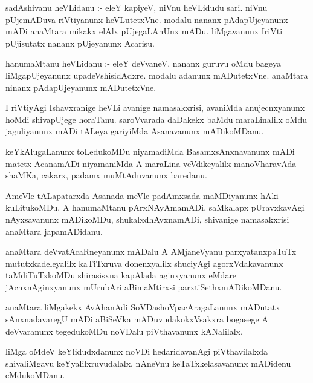 \documentclass{article}
\begin{document}
\begin{mn}
sadAshivanu  heVLidanu :- eleY  kapiyeV,  niVnu  heVLidudu  sari.  niVnu  pUjemADuva  riVtiyanunx  
heVLutetxVne.  modalu  nananx  pAdapUjeyanunx  mADi  anaMtara  mikakx  elAlx  pUjegaLAnUnx  mADu.  
liMgavanunx  IriVti  pUjisutatx  nananx  pUjeyanunx  Acarisu.
\end{mn}

\begin{mn}
hanumaMtanu  heVLidanu :- eleY  deVvaneV,  nananx  guruvu  oMdu  bageya  liMgapUjeyanunx  upadeVshisidAdxre.  
modalu  adanunx  mADutetxVne.  anaMtara  ninanx  pAdapUjeyanunx  mADutetxVne.
\end{mn}

\begin{mn}
I riVtiyAgi  Ishavxranige  heVLi  avanige  namasakxrisi,  avaniMda  anujecnxyanunx  hoMdi  shivapUjege  horaTanu.  
saroVvarada  daDakekx  baMdu  maraLinalilx  oMdu  jaguliyanunx  mADi  tALeya  gariyiMda  Asanavanunx  mADikoMDanu.
\end{mn}

\begin{mn}
keYkAlugaLanunx  toLedukoMDu  niyamadiMda  BasamxsAnxnavanunx  mADi  matetx  AcanamADi  niyamaniMda  
A  maraLina  veVdikeyalilx  manoVharavAda  shaMKa,  cakarx,  padamx  muMtAduvanunx  baredanu.
\end{mn}

\begin{mn}
AmeVle  tALapatarxda  Asanada  meVle  padAmxsada  maMDiyanunx  hAki  kuLitukoMDu,  A  hanumaMtanu  pArxNAyAmamADi,  
saMkalapx  pUravxkavAgi  nAyxsavanunx  mADikoMDu,  shukalxdhAyxnamADi,  shivanige  namasakxrisi  anaMtara  japamADidanu.
\end{mn}

\begin{mn}
anaMtara  deVvatAcaRneyanunx  mADalu  A  AMjaneVyanu  parxyatanxpaTuTx  mututxkadeleyalilx  kaTiTxruva  
donenxyalilx  shuciyAgi  agorxVdakavanunx  taMdiTuTxkoMDu  shirasisxna  kapAlada  aginxyanunx  eMdare  
jAcnxnAginxyanunx  mUrubAri  aBimaMtirxsi  parxtiSethxmADikoMDanu.
\end{mn}

\begin{mn}
anaMtara  liMgakekx  AvAhanAdi  SoVDashoVpacAragaLanunx  mADutatx  sAnxnadavaregU  mADi  aBiSeVka  
mADuvudakokxVsakxra  bogasege  A  deVvaranunx  tegedukoMDu  noVDalu  piVthavanunx  kANalilalx.
\end{mn}

\begin{mn}
liMga  oMdeV  keYlidudxdanunx  noVDi  hedaridavanAgi  piVthavilalxda  shivaliMgavu  keYyalilxruvudalalx.  
nAneVnu  keTaTxkelasavanunx  mADidenu  eMdukoMDanu.
\end{mn}
\end{document}
